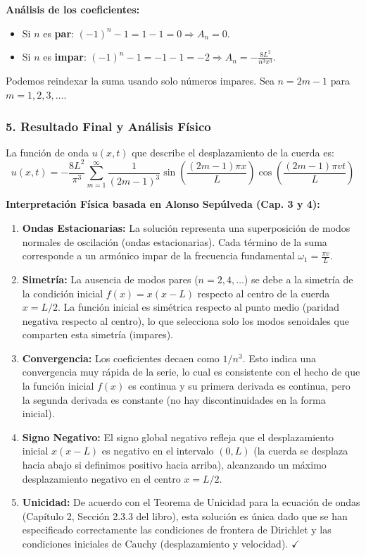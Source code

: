 \documentclass[a4paper]{article}
\begin{document}
\textbf{Análisis de los coeficientes:}
\begin{itemize}
    \item Si $n$ es \textbf{par}: $(-1)^n - 1 = 1 - 1 = 0 \Rightarrow A_n = 0$.
    \item Si $n$ es \textbf{impar}: $(-1)^n - 1 = -1 - 1 = -2 \Rightarrow A_n = -\frac{8 L^2}{n^3 \pi^3}$.
\end{itemize}
Podemos reindexar la suma usando solo números impares. Sea $n = 2m - 1$ para $m = 1, 2, 3, \dots$.

\subsubsection{5. Resultado Final y Análisis Físico}

La función de onda $u(x,t)$ que describe el desplazamiento de la cuerda es:
\begin{equation}
\boxed{u(x, t) = -\frac{8 L^2}{\pi^3} \sum_{m=1}^{\infty} \frac{1}{(2m-1)^3} \sin\left(\frac{(2m-1)\pi x}{L}\right) \cos\left(\frac{(2m-1)\pi v t}{L}\right)}
\end{equation}

\textbf{Interpretación Física basada en Alonso Sepúlveda (Cap. 3 y 4):}
\begin{enumerate}
    \item \textbf{Ondas Estacionarias:} La solución representa una superposición de modos normales de oscilación (ondas estacionarias). Cada término de la suma corresponde a un armónico impar de la frecuencia fundamental $\omega_1 = \frac{\pi v}{L}$.
    
    \item \textbf{Simetría:} La ausencia de modos pares ($n=2, 4, \dots$) se debe a la simetría de la condición inicial $f(x) = x(x-L)$ respecto al centro de la cuerda $x=L/2$. La función inicial es simétrica respecto al punto medio (paridad negativa respecto al centro), lo que selecciona solo los modos senoidales que comparten esta simetría (impares).
    
    \item \textbf{Convergencia:} Los coeficientes decaen como $1/n^3$. Esto indica una convergencia muy rápida de la serie, lo cual es consistente con el hecho de que la función inicial $f(x)$ es continua y su primera derivada es continua, pero la segunda derivada es constante (no hay discontinuidades en la forma inicial).
    
    \item \textbf{Signo Negativo:} El signo global negativo refleja que el desplazamiento inicial $x(x-L)$ es negativo en el intervalo $(0, L)$ (la cuerda se desplaza hacia abajo si definimos positivo hacia arriba), alcanzando un máximo desplazamiento negativo en el centro $x=L/2$.
    
    \item \textbf{Unicidad:} De acuerdo con el Teorema de Unicidad para la ecuación de ondas (Capítulo 2, Sección 2.3.3 del libro), esta solución es única dado que se han especificado correctamente las condiciones de frontera de Dirichlet y las condiciones iniciales de Cauchy (desplazamiento y velocidad). $\checkmark$
\end{enumerate}
\end{document}
